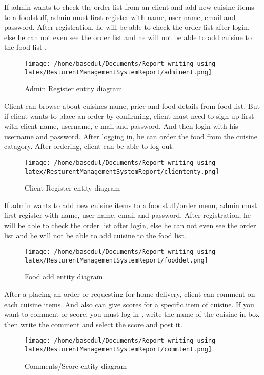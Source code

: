 \documentclass[12pt,a4paper]{article}
\newcommand\tab[1][1cm]{\hspace*{#1}}
\begin{document}
	\vspace{0.7cm}
	\tab If admin wants to check the order list from an client and add new cuisine items to a foodstuff, admin must first register with name, user name, email and password. After registration, he will be able to check the order list after login, else he can not even see the order list and he will not be able to add cuisine to the food list . 
	\begin{figure}[H]
		\centering
		\texttt{[image: /home/basedul/Documents/Report-writing-using-latex/ResturentManagementSystemReport/adminent.png]}
		\caption{Admin Register entity diagram}
		\label{fig:adminreg} 
	\end{figure}
	\tab Client can browse about cuisines name, price and food details from food list. But if client wants to place an order by confirming, client must need to sign up first with client name, username, e-mail and password. And then login with his username and password. After logging in, he can order the food from the cuisine catagory. After ordering, client can be able to log out.
	\begin{figure}[H]
		\centering
		\texttt{[image: /home/basedul/Documents/Report-writing-using-latex/ResturentManagementSystemReport/cliententy.png]}
		\caption{Client Register entity diagram}
		\label{fig:clientreg} 
	\end{figure}
	
	\tab If admin wants to add new cuisine items to a foodstuff/order menu, admin must first register with name, user name, email and password. After registration, he will be able to check the order list after login, else he can not even see the order list and he will not be able to add cuisine to the food list.
	\begin{figure}[H]
		\centering
		\texttt{[image: /home/basedul/Documents/Report-writing-using-latex/ResturentManagementSystemReport/fooddet.png]}
		\caption{Food add entity diagram}
		\label{fig:foodadd} 
	\end{figure}
	
	\tab After a placing an order or requesting for home delivery, client can comment on each cuisine items. And also can give scores for a specific item of cuisine. If you want to comment or score, you must log in , write the name of the cuisine in box then write the comment and select the score and post it. 
	\begin{figure}[H]
		\centering
		\texttt{[image: /home/basedul/Documents/Report-writing-using-latex/ResturentManagementSystemReport/commtent.png]}
		\caption{Comments/Score entity diagram}
		\label{fig:commentsent} 
	\end{figure}
	
\end{document}
